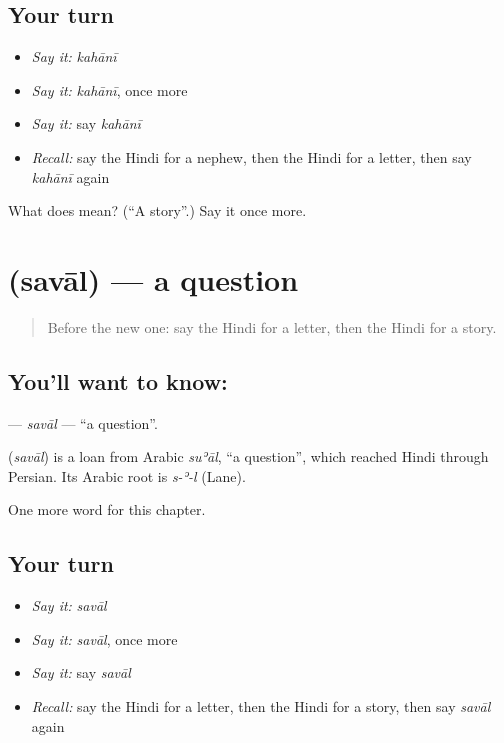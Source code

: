 \subsection*{Your turn}
\begin{itemize}
\raggedright
  \item \emph{Say it:} \emph{kahānī}
  \item \emph{Say it:} \emph{kahānī}, once more
  \item \emph{Say it:} say \emph{kahānī}
  \item \emph{Recall:} say the Hindi for a nephew, then the Hindi for a letter, then say \emph{kahānī} again
\end{itemize}

\begin{tcolorbox}[breakable,colback=teal!4,colframe=teal!35!black,title={Before you move on}]
What does  mean? (\textquotedblleft{}A story\textquotedblright{}.) Say it once more.
\end{tcolorbox}
\section[\texorpdfstring{\hi{सवाल} (savāl)}{सवाल (savāl)}]{ (savāl) — a question}

\label{lesson:HI-C189-saval}



\begin{quote}
Before the new one: say the Hindi for a letter, then the Hindi for a story.
\end{quote}

\subsection*{You'll want to know: }
\textbf{} — \emph{savāl} — \textquotedblleft{}a question\textquotedblright{}.

\begin{cousinweb}
\textbf{} (\emph{savāl}) is a loan from Arabic \emph{suʾāl}, \textquotedblleft{}a question\textquotedblright{}, which reached Hindi through Persian. Its Arabic root is \emph{s-ʾ-l} (Lane).
\end{cousinweb}

\begin{grammarlens}[title={What you've built}]
One more word for this chapter.
\end{grammarlens}

\subsection*{Your turn}
\begin{itemize}
\raggedright
  \item \emph{Say it:} \emph{savāl}
  \item \emph{Say it:} \emph{savāl}, once more
  \item \emph{Say it:} say \emph{savāl}
  \item \emph{Recall:} say the Hindi for a letter, then the Hindi for a story, then say \emph{savāl} again
\end{itemize}

